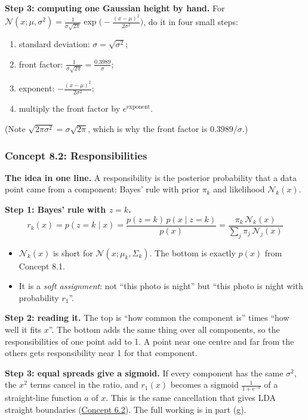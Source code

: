 \documentclass[12pt,a4paper]{article}
\begin{document}
\textbf{Step 3: computing one Gaussian height by hand.} For $\mathcal{N}(x;\mu,\sigma^2)=\frac{1}{\sigma\sqrt{2\pi}}\exp\!\big(-\frac{(x-\mu)^2}{2\sigma^2}\big)$, do it in four small steps:
\begin{enumerate}[nosep]
  \item standard deviation: $\sigma=\sqrt{\sigma^2}$;
  \item front factor: $\frac{1}{\sigma\sqrt{2\pi}}=\frac{0.3989}{\sigma}$;
  \item exponent: $-\frac{(x-\mu)^2}{2\sigma^2}$;
  \item multiply the front factor by $e^{\text{exponent}}$.
\end{enumerate}
(Note $\sqrt{2\pi\sigma^2}=\sigma\sqrt{2\pi}$, which is why the front factor is $0.3989/\sigma$.)

\subsubsection{Concept 8.2: Responsibilities}\label{c8-2}

\textbf{The idea in one line.} A responsibility is the posterior probability that a data point came from a component: Bayes' rule with prior $\pi_k$ and likelihood $\mathcal{N}_k(x)$.

\textbf{Step 1: Bayes' rule with $z=k$.}
\[
r_k(x)=p(z=k\mid x)=\frac{p(z=k)\,p(x\mid z=k)}{p(x)}=\frac{\pi_k\,\mathcal{N}_k(x)}{\sum_j\pi_j\,\mathcal{N}_j(x)}
\]
\begin{itemize}[nosep]
  \item $\mathcal{N}_k(x)$ is short for $\mathcal{N}(x;\mu_k,\Sigma_k)$. The bottom is exactly $p(x)$ from Concept 8.1.
  \item It is a \emph{soft assignment}: not ``this photo is night'' but ``this photo is night with probability $r_1$''.
\end{itemize}

\textbf{Step 2: reading it.} The top is ``how common the component is'' times ``how well it fits $x$''. The bottom adds the same thing over all components, so the responsibilities of one point add to 1. A point near one centre and far from the others gets responsibility near 1 for that component.

\textbf{Step 3: equal spreads give a sigmoid.} If every component has the same $\sigma^2$, the $x^2$ terms cancel in the ratio, and $r_1(x)$ becomes a sigmoid $\frac{1}{1+e^{-a}}$ of a straight-line function $a$ of $x$. This is the same cancellation that gives LDA straight boundaries (\hyperref[c6-2]{Concept 6.2}). The full working is in part (g).
\end{document}
